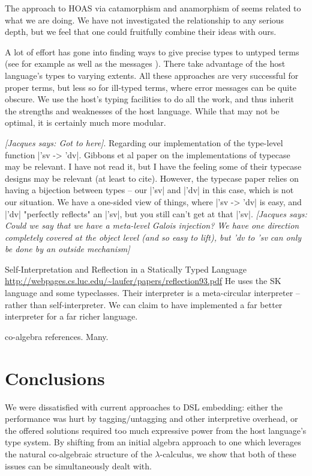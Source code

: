 \documentclass[preprint]{sigplanconf}
\newcommand{\jacques}[1]{{\it [Jacques says: #1]}}
\begin{document}
The approach to HOAS via catamorphism and anamorphism of
\citet{Washburn-Weirich-boxes} seems related to what we are doing.
We have not investigated the relationship to any serious depth, but we
feel that one could fruitfully combine their ideas with ours.

A lot of effort has gone into finding ways to give precise types to untyped
terms (see for example \citet{baars-typing,Guillemette-Monier-PLPV}
as well as the messages \citet{haskell-019160,haskell-019161}).  There 
take advantage of the host language's types to varying extents.  All 
these approaches are very successful for proper terms, but less so for
ill-typed terms, where error messages can be quite obscure.  We use the
host's typing facilities to do all the work, and thus inherit the strengths
and weaknesses of the host language.  While that may not be optimal, it is
certainly much more modular.

\jacques{Got to here}.
Regarding our implementation of the type-level function |'sv -> 'dv|.
Gibbons et al paper on
the implementations of typecase may be relevant. I have not read it,
but I have the feeling some of their typecase designs may be
relevant (at least to cite). 
However, the typecase paper relies on having a 
bijection between types -- our |'sv| and |'dv| in this case, which is not 
our situation.  We have a one-sided view of things, where |'sv -> 'dv| is 
easy, and |'dv| "perfectly reflects" an |'sv|, but you still can't get at 
that |'sv|.  \jacques{Could we say that we have a meta-level Galois
injection?  We have one direction completely covered at the object
level (and so easy to lift), but 'dv to 'sv can only be done by
an outside mechanism}


Self-Interpretation and Reflection in a Statically Typed Language 
\url{http://webpages.cs.luc.edu/~laufer/papers/reflection93.pdf}
He uses the SK language and some typeclasses. Their interpreter is a
meta-circular interpreter -- rather than self-interpreter. We can
claim to have implemented a far better interpreter for a far richer
language.

co-algebra references.  Many.

\section{Conclusions}\label{conclusion}

We were dissatisfied with current approaches to DSL embedding: either
the performance was hurt by tagging/untagging and other interpretive
overhead, or the offered solutions required too much expressive power
from the host language's type system.  By shifting from an initial
algebra approach to one which leverages the natural co-algebraic structure
of the $\lambda$-calculus, we show that both of these issues can be 
simultaneously dealt with.
\end{document}
